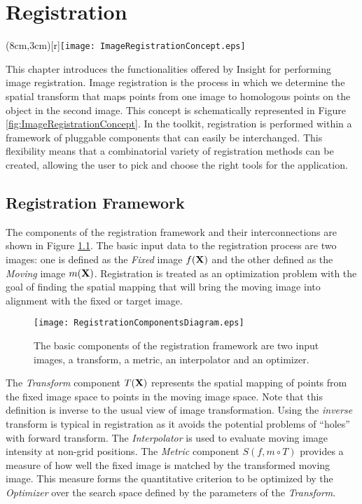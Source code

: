 
\chapter{Registration}

\parpic(8cm,3cm)[r]{\texttt{[image: ImageRegistrationConcept.eps]}}
  
This chapter introduces the functionalities offered by Insight for performing
image registration. Image registration is the process in which we determine the
spatial transform that maps points from one image to homologous points on the
object in the second image. This concept is schematically represented in Figure
\ref{fig:ImageRegistrationConcept}. In the toolkit, registration is performed
within a framework of pluggable components that can easily be interchanged.
This flexibility means that a combinatorial variety of registration methods can
be created, allowing the user to pick and choose the right tools for the
application.


\section{Registration Framework}
The components of the registration framework and their interconnections 
are shown in Figure \ref{fig:RegistrationComponents}. The basic
input data to the registration process are two images: one
is defined as the \emph{Fixed} image $f(\bf{X})$ and the other defined as the
\emph{Moving} image $m(\bf{X})$. Registration is treated as an optimization problem
with the goal of finding the spatial mapping that will bring the moving image into 
alignment with the fixed or target image.

\begin{figure}
\center
\texttt{[image: RegistrationComponentsDiagram.eps]}
\caption{The basic components of the registration framework are two input images,
a transform, a metric, an interpolator and an optimizer.}
\label{fig:RegistrationComponents}
\end{figure}

The \emph{Transform} component $T(\bf{X})$ represents the spatial mapping of
points from the fixed image space to points in the moving image space. Note
that this definition is inverse to the usual view of image transformation.
Using the \emph{inverse} transform is typical in registration as it avoids the
potential problems of ``holes'' with forward transform. The \emph{Interpolator}
is used to evaluate moving image intensity at non-grid positions. The
\emph{Metric} component $S(f,m \circ T)$ provides a measure of how well the
fixed image is matched by the transformed moving image. This measure forms the
quantitative criterion to be optimized by the \emph{Optimizer} over the search
space defined by the parameters of the \emph{Transform}.

